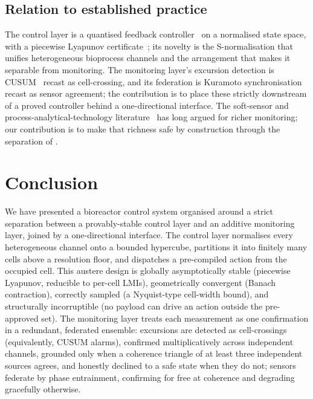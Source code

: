 \documentclass[11pt,a4paper,twocolumn]{article}
\theoremstyle{thmstyle}
\theoremstyle{definition}
\theoremstyle{remark}
\begin{document}
\subsection{Relation to established practice}

The control layer is a quantised feedback
controller~\citep{brockett2000quantized} on a normalised state space, with
a piecewise Lyapunov certificate~\citep{johansson1998computation,liberzon2003switching};
its novelty is the S-normalisation that unifies heterogeneous bioprocess
channels and the arrangement that makes it separable from monitoring. The
monitoring layer's excursion detection is CUSUM~\citep{page1954continuous,montgomery2020spc}
recast as cell-crossing, and its federation is Kuramoto
synchronisation~\citep{strogatz2000kuramoto,acebron2005kuramoto} recast as
sensor agreement; the contribution is to place these strictly downstream of
a proved controller behind a one-directional interface. The soft-sensor
and process-analytical-technology
literature~\citep{luttmann2012softsensors,lourenco2012bioprocess,fda2004pat}
has long argued for richer monitoring; our contribution is to make that
richness safe by construction through the separation of .

\section{Conclusion}
\label{sec:conclusion}

We have presented a bioreactor control system organised around a strict
separation between a provably-stable control layer and an additive
monitoring layer, joined by a one-directional interface. The control
layer normalises every heterogeneous channel onto a bounded hypercube,
partitions it into finitely many cells above a resolution floor, and
dispatches a pre-compiled action from the occupied cell. This austere
design is globally asymptotically stable (piecewise Lyapunov, reducible to
per-cell LMIs), geometrically convergent (Banach contraction), correctly
sampled (a Nyquist-type cell-width bound), and structurally incorruptible
(no payload can drive an action outside the pre-approved set). The
monitoring layer treats each measurement as one confirmation in a
redundant, federated ensemble: excursions are detected as cell-crossings
(equivalently, CUSUM alarms), confirmed multiplicatively across
independent channels, grounded only when a coherence triangle of at least
three independent sources agrees, and honestly declined to a safe state
when they do not; sensors federate by phase entrainment, confirming for
free at coherence and degrading gracefully otherwise.
\end{document}
